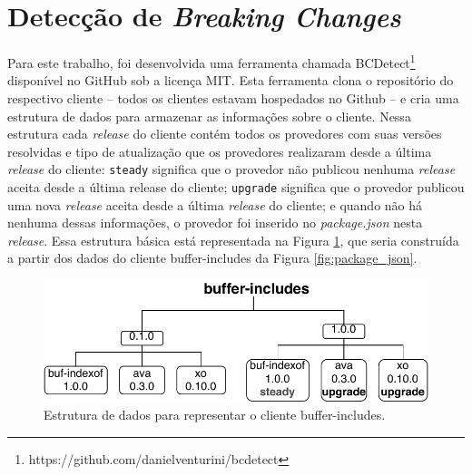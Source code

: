 \section{Detecção de \textit{Breaking Changes}}
\label{sec:bcdetect}
Para este trabalho, foi desenvolvida uma ferramenta chamada \textsf{BCDetect}\footnote{https://github.com/danielventurini/bcdetect} disponível no \textsf{GitHub} sob a licença \textsf{MIT}. Esta ferramenta clona o repositório do respectivo cliente -- todos os clientes estavam hospedados no \textsf{Github} -- e cria uma estrutura de dados para armazenar as informações sobre o cliente. Nessa estrutura cada \textit{release} do cliente contém todos os provedores com suas versões resolvidas e tipo de atualização que os provedores realizaram desde a última \textit{release} do cliente: \texttt{steady} significa que o provedor não publicou nenhuma \textit{release} aceita desde a última release do cliente; \texttt{upgrade} significa que o provedor publicou uma nova \textit{release} aceita desde a última \textit{release} do cliente; e quando não há nenhuma dessas informações, o provedor foi inserido no \textit{package.json} nesta \textit{release}. Essa estrutura básica está representada na Figura \ref{fig:bc_work}, que seria construída a partir dos dados do cliente \textsf{buffer-includes} da Figura \ref{fig:package_json}.

\begin{figure}
    \centering
    \includegraphics[scale=0.9]{figuras/bcdetect_work.pdf}
    \caption{Estrutura de dados para representar o cliente \textsf{buffer-includes}.}
    \label{fig:bc_work}
\end{figure}{}

